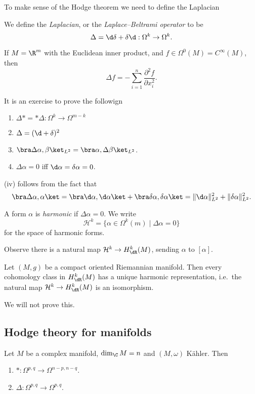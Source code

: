 \documentclass[a4paper]{article}
\begin{document}
To make sense of the Hodge theorem we need to define the Laplacian
\begin{defi}
  We define the \emph{Laplacian}, or the \emph{Laplace--Beltrami operator} to be
  \[
    \Delta = \d \delta + \delta \d: \Omega^k \to \Omega^k.
  \]
\end{defi}

\begin{eg}
  If $M = \R^m$ with the Euclidean inner product, and $f \in \Omega^0(M) = C^\infty(M)$, then
  \[
    \Delta f = - \sum_{i = 1}^n \frac{\partial^2 f}{\partial x_i^2}.
  \]
\end{eg}

It is an exercise to prove the followign
\begin{prop}\leavevmode
  \begin{enumerate}
    \item $\Delta * = *\Delta: \Omega^k \to \Omega^{m - k}$
    \item $\Delta = (\d + \delta)^2$
    \item $\bra \Delta \alpha, \beta\ket_{L^2} = \bra \alpha, \Delta \beta\ket_{L^2}$.
    \item $\Delta \alpha = 0$ iff $\d \alpha = \delta \alpha = 0$.\fakeqed
  \end{enumerate}
\end{prop}
(iv) follows from the fact that
\[
  \bra \Delta \alpha, \alpha\ket = \bra \d \alpha, \d \alpha\ket + \bra \delta \alpha, \delta \alpha\ket = \|\d \alpha\|_{L^2}^2 + \|\delta \alpha\|_{L^2}^2.
\]
\begin{defi}
  A form $\alpha$ is \emph{harmonic} if $\Delta \alpha = 0$. We write
  \[
    \mathcal{H}^k = \{\alpha \in \Omega^k(m) \mid \Delta \alpha = 0\}
  \]
  for the space of harmonic forms.
\end{defi}
Observe there is a natural map $\mathcal{H}^k \to H^k_{\dR}(M)$, sending $\alpha$ to $[\alpha]$.
\begin{thm}
  Let $(M, g)$ be a compact oriented Riemannian manifold. Then every cohomology class in $H_{\dR}^k(M)$ has a unique harmonic representation, i.e.\ the natural map $\mathcal{H} ^k \to H_{\dR}^k(M)$ is an isomorphism.\qedhere
\end{thm}
We will not prove this.

\subsection{Hodge theory for  manifolds} %
\begin{prop}
  Let $M$ be a complex manifold, $\dim_\C M = n$ and $(M, \omega)$ K\"ahler. Then
  \begin{enumerate}
    \item $*: \Omega^{p, q} \to \Omega^{n - p, n - q}$.
    \item $\Delta: \Omega^{p, q} \to \Omega^{p, q}$.
  \end{enumerate}
\end{prop}
\end{document}
